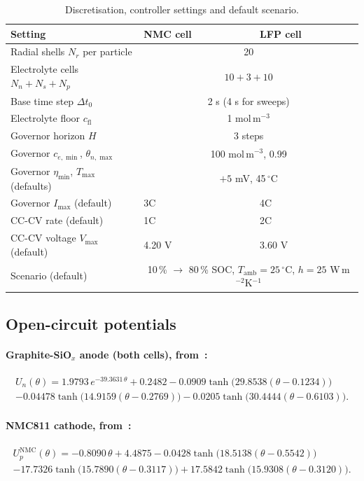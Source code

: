 \documentclass[11pt]{article}
\newcommand{\Tamb}{T_{\mathrm{amb}}}
\begin{document}
\begin{table}[ht]
\centering\small
\caption{Discretisation, controller settings and default scenario.}\label{tab:ctrl}
\begin{tabular}{@{}l l l@{}}
\toprule
Setting & NMC cell & LFP cell\\
\midrule
Radial shells $N_r$ per particle & \multicolumn{2}{c}{20}\\
Electrolyte cells $N_n+N_s+N_p$ & \multicolumn{2}{c}{$10+3+10$}\\
Base time step $\Delta t_0$ & \multicolumn{2}{c}{2 s (4 s for sweeps)}\\
Electrolyte floor $c_{\mathrm{fl}}$ & \multicolumn{2}{c}{1 mol\,m$^{-3}$}\\
Governor horizon $H$ & \multicolumn{2}{c}{3 steps}\\
Governor $c_{e,\min}$, $\theta_{n,\max}$ & \multicolumn{2}{c}{100 mol\,m$^{-3}$, 0.99}\\
Governor $\eta_{\min}$, $T_{\max}$ (defaults) & \multicolumn{2}{c}{$+5$ mV, 45\,$^\circ$C}\\
Governor $I_{\max}$ (default) & 3C & 4C\\
CC-CV rate (default) & 1C & 2C\\
CC-CV voltage $V_{\max}$ (default) & 4.20 V & 3.60 V\\
Scenario (default) & \multicolumn{2}{c}{10\,\% $\rightarrow$ 80\,\% SOC, $\Tamb=25\,^\circ$C, $h=25$ W\,m$^{-2}$K$^{-1}$}\\
\bottomrule
\end{tabular}
\end{table}

\subsection{Open-circuit potentials}
\paragraph{Graphite-SiO$_x$ anode (both cells), from~\cite{chen2020}:}
\begin{multline}
U_n(\theta)=1.9793\,e^{-39.3631\,\theta}+0.2482-0.0909\tanh\!\bigl(29.8538(\theta-0.1234)\bigr)\\
-0.04478\tanh\!\bigl(14.9159(\theta-0.2769)\bigr)-0.0205\tanh\!\bigl(30.4444(\theta-0.6103)\bigr).
\end{multline}
\paragraph{NMC811 cathode, from~\cite{chen2020}:}
\begin{multline}
U_p^{\mathrm{NMC}}(\theta)=-0.8090\,\theta+4.4875-0.0428\tanh\!\bigl(18.5138(\theta-0.5542)\bigr)\\
-17.7326\tanh\!\bigl(15.7890(\theta-0.3117)\bigr)+17.5842\tanh\!\bigl(15.9308(\theta-0.3120)\bigr).
\end{multline}
\end{document}
